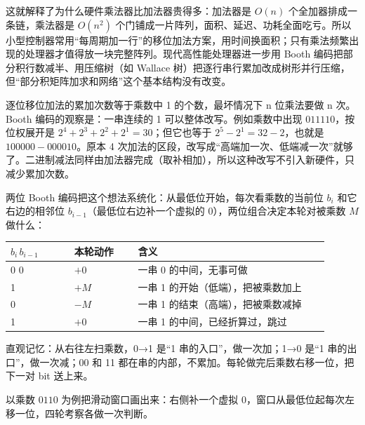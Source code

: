 这就解释了为什么硬件乘法器比加法器贵得多：加法器是 $O(n)$ 个全加器排成一条链，乘法器是 $O(n^2)$ 个门铺成一片阵列，面积、延迟、功耗全面吃亏。所以小型控制器常用“每周期加一行”的移位加法方案，用时间换面积；只有乘法频繁出现的处理器才值得放一块完整阵列。现代高性能处理器进一步用 Booth 编码把部分积行数减半、用压缩树（如 Wallace 树）把逐行串行累加改成树形并行压缩，但“部分积矩阵加求和网络”这个基本结构没有改变。


逐位移位加法的累加次数等于乘数中 1 的个数，最坏情况下 n 位乘法要做 n 次。Booth 编码的观察是：一串连续的 1 可以整体改写。例如乘数中出现 $011110$，按位权展开是 $2^4+2^3+2^2+2^1=30$；但它也等于 $2^5-2^1=32-2$，也就是 $100000-000010$。原本 4 次加法的区段，改写成“高端加一次、低端减一次”就够了。二进制减法同样由加法器完成（取补相加），所以这种改写不引入新硬件，只减少累加次数。

两位 Booth 编码把这个想法系统化：从最低位开始，每次看乘数的当前位 $b_i$ 和它右边的相邻位 $b_{i-1}$（最低位右边补一个虚拟的 0），两位组合决定本轮对被乘数 $M$ 做什么：

\begin{longtable}{L{0.18\linewidth}L{0.18\linewidth}L{0.54\linewidth}}
\toprule
$b_i\,b_{i-1}$ & 本轮动作 & 含义 \\
 0 & $+0$ & 一串 0 的中间，无事可做 \\ 1 & $+M$ & 一串 1 的开始（低端），把被乘数加上 \\ 0 & $-M$ & 一串 1 的结束（高端），把被乘数减掉 \\ 1 & $+0$ & 一串 1 的中间，已经折算过，跳过 \\
\bottomrule
\end{longtable}

直观记忆：从右往左扫乘数，0→1 是“1 串的入口”，做一次加；1→0 是“1 串的出口”，做一次减；00 和 11 都在串的内部，不累加。每轮做完后乘数右移一位，把下一对 bit 送上来。

以乘数 $0110$ 为例把滑动窗口画出来：右侧补一个虚拟 0，窗口从最低位起每次左移一位，四轮考察各做一次判断。

